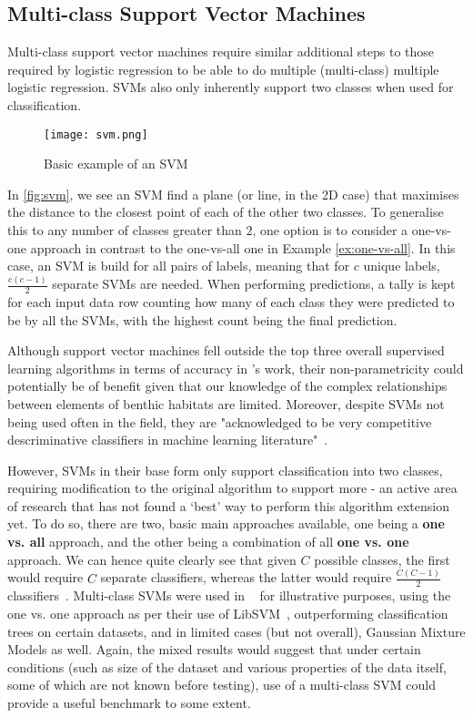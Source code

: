 \subsection{Multi-class Support Vector Machines}

Multi-class support vector machines require similar additional steps to those required by logistic regression to be able to do multiple (multi-class) multiple logistic regression. SVMs also only inherently support two classes when used for classification.

\begin{figure}
    \texttt{[image: svm.png]}
    \caption{Basic example of an SVM}
    \label{fig:svm}
\end{figure}

In \autoref{fig:svm}, we see an SVM find a plane (or line, in the 2D case) that maximises the distance to the closest point of each of the other two classes. To generalise this to any number of classes greater than $2$, one option is to consider a one-vs-one approach in contrast to the one-vs-all one in Example \autoref{ex:one-vs-all}. In this case, an SVM is build for all pairs of labels, meaning that for $c$ unique labels, $\frac{c(c-1)}{2}$ separate SVMs are needed. When performing predictions, a tally is kept for each input data row counting how many of each class they were predicted to be by all the SVMs, with the highest count being the final prediction.

Although support vector machines fell outside the top three overall supervised learning algorithms in terms of accuracy in \citet{caruana06}'s work, their non-parametricity could potentially be of benefit given that our knowledge of the complex relationships between elements of benthic habitats are limited. Moreover, despite SVMs not being used often in the field, they are "acknowledged to be very competitive descriminative classifiers in machine learning literature"~\citep{ahsan11}. 

However, SVMs in their base form only support classification into two classes, requiring modification to the original algorithm to support more - an active area of research that has not found a `best' way to perform this algorithm extension yet. To do so, there are two, basic main approaches available, one being a \textbf{one vs. all} approach, and the other being a combination of all \textbf{one vs. one} approach. We can hence quite clearly see that given $C$ possible classes, the first would require $C$ separate classifiers, whereas the latter would require $\frac{C(C-1)}{2}$ classifiers~\citep{murphy12}. Multi-class SVMs were used in ~\citet{ahsan11} for illustrative purposes, using the one vs. one approach as per their use of LibSVM~\citep{chang11}, outperforming classification trees on certain datasets, and in limited cases (but not overall), Gaussian Mixture Models as well. Again, the mixed results would suggest that under certain conditions (such as size of the dataset and various properties of the data itself, some of which are not known before testing), use of a multi-class SVM could provide a useful benchmark to some extent.

